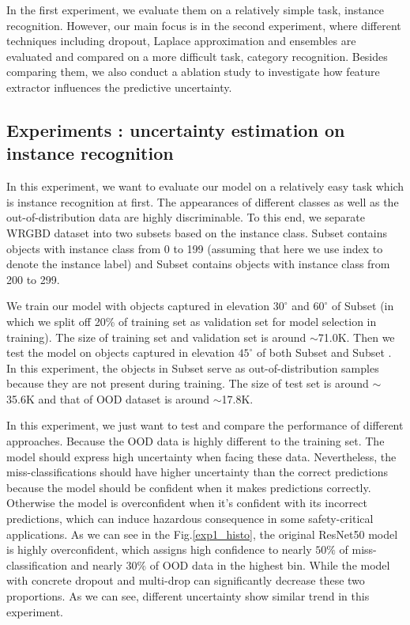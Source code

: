 In the first experiment, we evaluate them on a relatively simple task, instance recognition. However, our main focus is in the second experiment, where different techniques including dropout, Laplace approximation and ensembles are evaluated and compared on a more difficult task, category recognition. Besides comparing them, we also conduct a ablation study to investigate how feature extractor influences the predictive uncertainty.

\subsection{Experiments : uncertainty estimation on instance recognition}
In this experiment, we want to evaluate our model on a relatively easy task which is instance recognition at first. The appearances of different classes as well as the out-of-distribution data are highly discriminable. To this end, we separate WRGBD dataset into two subsets based on the instance class. Subset  contains objects with instance class from 0 to 199 (assuming that here we use index to denote the instance label) and Subset  contains objects with instance class from 200 to 299. 

We train our model with objects captured in elevation $30^\circ$ and $60^\circ$ of Subset  (in which we split off 20\% of training set as validation set for model selection in training). The size of training set and validation set is around $\sim$71.0K. Then we test the model on objects captured in elevation $45^\circ$ of both Subset  and Subset . In this experiment, the objects in Subset  serve as out-of-distribution samples because they are not present during training. The size of test set is around $\sim$35.6K and that of OOD dataset is around $\sim$17.8K. 

In this experiment, we just want to test and compare the performance of different approaches. Because the OOD data is highly different to the training set. The model should express high uncertainty when facing these data. Nevertheless, the miss-classifications should have higher uncertainty than the correct predictions because the model should be confident when it makes predictions correctly. Otherwise the model is overconfident when it's confident with its incorrect predictions, which can induce hazardous consequence in some safety-critical applications. As we can see in the Fig.\ref{exp1_histo}, the original ResNet50 model is highly overconfident, which assigns high confidence to nearly $50\%$ of miss-classification and nearly $30\%$ of OOD data in the highest bin. While the model with concrete dropout and multi-drop can significantly decrease these two proportions. As we can see, different uncertainty show similar trend in this experiment.


